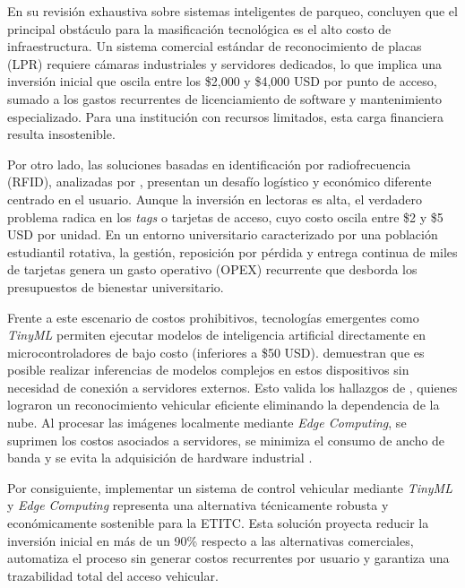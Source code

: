 \documentclass[12pt, letterpaper]{article}
\begin{document}
En su revisión exhaustiva sobre sistemas inteligentes de parqueo, \textcite{alam2023survey} concluyen que el principal obstáculo para la masificación tecnológica es el alto costo de infraestructura. Un sistema comercial estándar de reconocimiento de placas (LPR) requiere cámaras industriales y servidores dedicados, lo que implica una inversión inicial que oscila entre los \$2,000 y \$4,000 USD por punto de acceso, sumado a los gastos recurrentes de licenciamiento de software y mantenimiento especializado. Para una institución con recursos limitados, esta carga financiera resulta insostenible.

Por otro lado, las soluciones basadas en identificación por radiofrecuencia (RFID), analizadas por \textcite{olivares2011rfid}, presentan un desafío logístico y económico diferente centrado en el usuario. Aunque la inversión en lectoras es alta, el verdadero problema radica en los \textit{tags} o tarjetas de acceso, cuyo costo oscila entre \$2 y \$5 USD por unidad. En un entorno universitario caracterizado por una población estudiantil rotativa, la gestión, reposición por pérdida y entrega continua de miles de tarjetas genera un gasto operativo (OPEX) recurrente que desborda los presupuestos de bienestar universitario.

Frente a este escenario de costos prohibitivos, tecnologías emergentes como \textit{TinyML} permiten ejecutar modelos de inteligencia artificial directamente en microcontroladores de bajo costo (inferiores a \$50 USD). \textcite{warden2020tinyml} demuestran que es posible realizar inferencias de modelos complejos en estos dispositivos sin necesidad de conexión a servidores externos. Esto valida los hallazgos de \textcite{zheng2025iot}, quienes lograron un reconocimiento vehicular eficiente eliminando la dependencia de la nube. Al procesar las imágenes localmente mediante \textit{Edge Computing}, se suprimen los costos asociados a servidores, se minimiza el consumo de ancho de banda y se evita la adquisición de hardware industrial \parencite{satyanarayanan2017edge}.

Por consiguiente, implementar un sistema de control vehicular mediante \textit{TinyML} y \textit{Edge Computing} representa una alternativa técnicamente robusta y económicamente sostenible para la ETITC. Esta solución proyecta reducir la inversión inicial en más de un 90\% respecto a las alternativas comerciales, automatiza el proceso sin generar costos recurrentes por usuario y garantiza una trazabilidad total del acceso vehicular.
\end{document}
